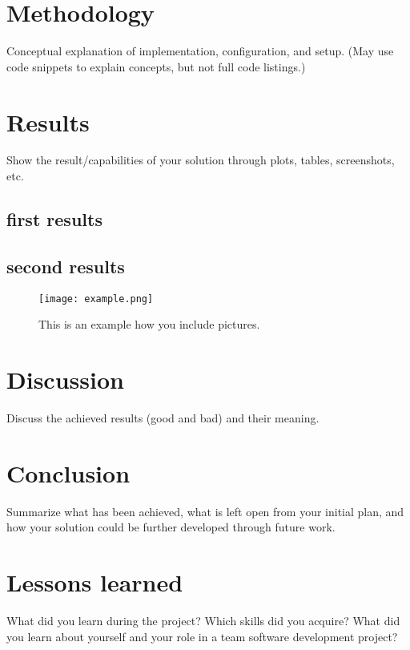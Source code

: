 \documentclass{article} %
\begin{document}
\section{Methodology}
Conceptual explanation of implementation, configuration, and setup. (May use
code snippets to explain concepts, but not full code listings.)\\
\lipsum[1-2]
\clearpage

\section{Results}
Show the result/capabilities of your solution through plots, tables, screenshots, etc.
\subsection{first results}
\lipsum[1-2]
\subsection{second results}
\lipsum[1-1]
\begin{figure}[h]
    \centering
    \texttt{[image: example.png]}
    \caption{This is an example how you include pictures.}
    \label{fig:example}
\end{figure}

\section{Discussion}
Discuss the achieved results (good and bad) and their meaning.\\
\lipsum[1-2]
\clearpage

\section{Conclusion}
Summarize what has been achieved, what is left open from your initial plan, and
how your solution could be further developed through future work.\\
\lipsum[1-2]
\clearpage

\section{Lessons learned}
What did you learn during the project? Which skills did you acquire? What
did you learn about yourself and your role in a team software development project?\\
\lipsum[1-3]
\clearpage
\end{document}
